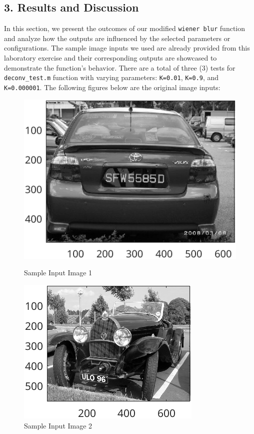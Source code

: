 \documentclass{article}
\begin{document}
	\subsection*{3. Results and Discussion}
	In this section, we present the outcomes of our modified {\texttt{wiener blur}} function and analyze how the outputs are influenced by the selected parameters or configurations. 
	The sample image inputs we used are already provided from this laboratory exercise and their corresponding outputs are showcased to demonstrate the function's behavior. There are a total of three (3)
	tests for {\texttt{deconv\_test.m}} function with varying parameters: {\texttt{K=0.01}}, {\texttt{K=0.9}}, and {\texttt{K=0.000001}}. The following figures below are the original image inputs:
	\begin{figure}[ht]
  	\centering
  	\begin{minipage}[t]{0.45\textwidth}
    	\centering
    	\includegraphics[width=\textwidth]{2AE1Orig}
    	\caption{Sample Input Image 1}
    	\label{fig:example1}
  	\end{minipage}\hfill
  	\begin{minipage}[t]{0.45\textwidth}
    	\centering
    	\includegraphics[width=\textwidth]{2AE2Orig}
    	\caption{Sample Input Image 2}
    	\label{fig:example2}
  	\end{minipage}
	\end{figure}
\end{document}
